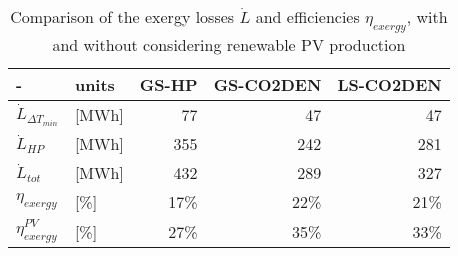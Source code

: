 \begin{table}[htp]
\centering
\caption{Comparison of the exergy losses $\dot{L}$ and efficiencies $\eta_{exergy}$, with and without considering renewable PV production}\vspace{2mm}
\label{tab:V_exergy} 
\begin{tabular}{llrrr} \toprule
	-                    & units & GS-HP & GS-CO2DEN & LS-CO2DEN \\ \midrule
	$\dot{L}_{\Delta T_{min}}$       & [MWh] & 77    & 47        & 47        \\
	$\dot{L}_{HP}$             & [MWh] & 355   & 242       & 281       \\
	$\dot{L}_{tot}$            & [MWh] & 432   & 289       & 327       \\
	$\eta_{exergy}$      & [\%]  & 17\%   & 22\%       & 21\%       \\
	$\eta_{exergy}^{PV}$ & [\%]  & 27\%   & 35\%       & 33\%      \\ \bottomrule
	\end{tabular}
\end{table}
